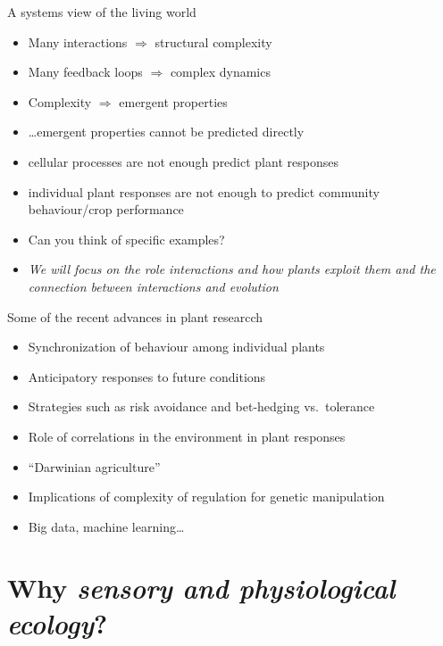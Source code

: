 \documentclass[10pt]{beamer}
\begin{document}
\begin{frame}{A systems view of the living world}
  \begin{itemize}
    \item Many interactions $\Rightarrow$ structural complexity
    \item Many feedback loops $\Rightarrow$ complex dynamics
    \item Complexity $\Rightarrow$ emergent properties
    \item \ldots emergent properties cannot be predicted directly
    \item \Attention cellular processes are not enough predict plant responses
    \item \Attention individual plant responses are not enough to predict community behaviour/crop performance
    \item \DiscussionI Can you think of specific examples?
    \item \emph{We will focus on the role interactions and how plants
    exploit them and the connection between interactions and evolution}
  \end{itemize}
\end{frame}

\begin{frame}{Some of the recent advances in plant researcch}
   \begin{itemize}
     \item Synchronization of behaviour among individual plants
     \item Anticipatory responses to future conditions
     \item Strategies such as risk avoidance and bet-hedging vs.\ tolerance
     \item Role of correlations in the environment in plant responses
     \item ``Darwinian agriculture''
     \item Implications of complexity of regulation for genetic manipulation
     \item Big data, machine learning\ldots
   \end{itemize}
\end{frame}

\section{Why \emph{sensory and physiological ecology}?}
\end{document}
